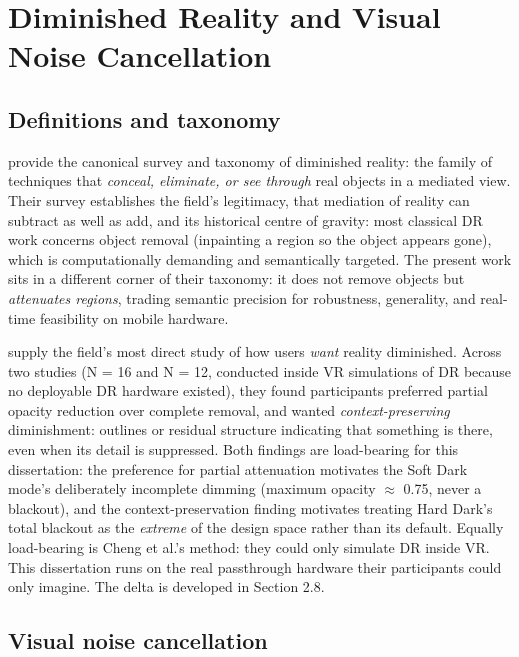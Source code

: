 \section{Diminished Reality and Visual Noise Cancellation}

\subsection{Definitions and taxonomy}

\citet{mori2017} provide the canonical survey and taxonomy of diminished reality: the
family of techniques that \textit{conceal, eliminate, or see through} real objects in a mediated view. Their
survey establishes the field's legitimacy, that mediation of reality can subtract as well as add,
and its historical centre of gravity: most classical DR work concerns object removal (inpainting a
region so the object appears gone), which is computationally demanding and semantically targeted.
The present work sits in a different corner of their taxonomy: it does not remove objects but
\textit{attenuates regions}, trading semantic precision for robustness, generality, and real-time
feasibility on mobile hardware.

\citet{cheng2022} supply the field's most direct study of how users
\textit{want} reality diminished. Across two studies (N = 16 and N = 12, conducted inside VR simulations of
DR because no deployable DR hardware existed), they found participants preferred partial opacity
reduction over complete removal, and wanted \textit{context-preserving} diminishment: outlines or residual
structure indicating that something is there, even when its detail is suppressed. Both findings are
load-bearing for this dissertation: the preference for partial attenuation motivates the Soft Dark
mode's deliberately incomplete dimming (maximum opacity $\approx$ 0.75, never a blackout), and the
context-preservation finding motivates treating Hard Dark's total blackout as the \textit{extreme} of the
design space rather than its default. Equally load-bearing is Cheng et al.'s method: they could only
simulate DR inside VR. This dissertation runs on the real passthrough hardware their participants
could only imagine. The delta is developed in Section 2.8.

\subsection{Visual noise cancellation}

